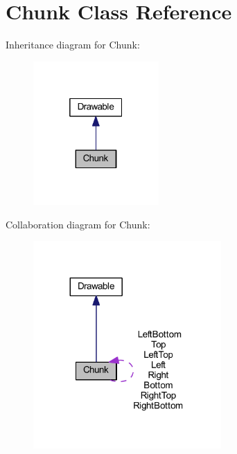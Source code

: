 \hypertarget{class_chunk}{\section{Chunk Class Reference}
\label{class_chunk}
}


Inheritance diagram for Chunk\-:\nopagebreak
\begin{figure}[H]
\begin{center}
\leavevmode
\includegraphics[width=136pt]{class_chunk__inherit__graph}
\end{center}
\end{figure}


Collaboration diagram for Chunk\-:\nopagebreak
\begin{figure}[H]
\begin{center}
\leavevmode
\includegraphics[width=203pt]{class_chunk__coll__graph}
\end{center}
\end{figure}
